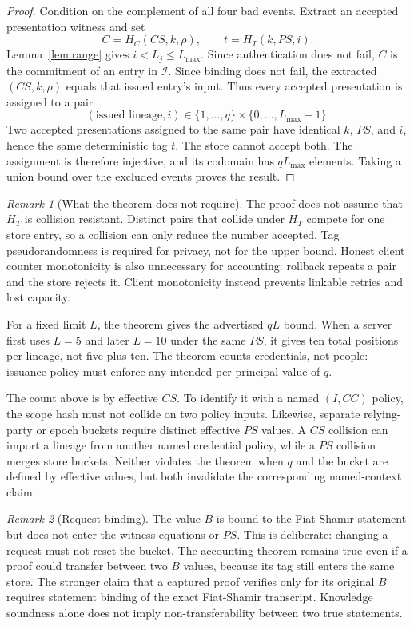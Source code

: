 \documentclass[11pt]{article}
\newcommand{\Issued}{\mathcal{I}}
\theoremstyle{remark}
\newtheorem{remark}{Remark}
\begin{document}
\begin{proof}
Condition on the complement of all four bad events. Extract an accepted
presentation witness and set
\[
 C=H_C(CS,k,\rho),\qquad
 t=H_T(k,PS,i).
\]
Lemma~\ref{lem:range} gives $i<L_j\leq L_{\max}$. Since authentication does
not fail, $C$ is the commitment of an entry in $\Issued$. Since binding does
not fail, the extracted $(CS,k,\rho)$ equals that issued entry's input. Thus
every accepted presentation is assigned to a pair
\[
   (\text{issued lineage},i)
   \in \{1,\ldots,q\}\times\{0,\ldots,L_{\max}-1\}.
\]
Two accepted presentations assigned to the same pair have identical $k$,
$PS$, and $i$, hence the same deterministic tag $t$. The store cannot accept
both. The assignment is therefore injective, and its codomain has
$qL_{\max}$ elements. Taking a union bound over the excluded events proves
the result.
\end{proof}

\begin{remark}[What the theorem does not require]
The proof does not assume that $H_T$ is collision resistant. Distinct pairs
that collide under $H_T$ compete for one store entry, so a collision can only
reduce the number accepted. Tag pseudorandomness is required for privacy, not
for the upper bound. Honest client counter monotonicity is also unnecessary
for accounting: rollback repeats a pair and the store rejects it. Client
monotonicity instead prevents linkable retries and lost capacity.
\end{remark}

For a fixed limit $L$, the theorem gives the advertised $qL$ bound. When a
server first uses $L=5$ and later $L=10$ under the same $PS$, it gives ten
total positions per lineage, not five plus ten. The theorem counts
credentials, not people: issuance policy must enforce any intended
per-principal value of $q$.

The count above is by effective $CS$. To identify it with a named
$(I,CC)$ policy, the scope hash must not collide on two policy inputs.
Likewise, separate relying-party or epoch buckets require distinct effective
$PS$ values. A $CS$ collision can import a lineage from another named
credential policy, while a $PS$ collision merges store buckets. Neither
violates the theorem when $q$ and the bucket are defined by effective values,
but both invalidate the corresponding named-context claim.

\begin{remark}[Request binding]
The value $B$ is bound to the Fiat-Shamir statement but does not enter the
witness equations or $PS$. This is deliberate: changing a request must not
reset the bucket. The accounting theorem remains true even if a proof could
transfer between two $B$ values, because its tag still enters the same store.
The stronger claim that a captured proof verifies only for its original $B$
requires statement binding of the exact Fiat-Shamir transcript. Knowledge
soundness alone does not imply non-transferability between two true
statements.
\end{remark}
\end{document}
